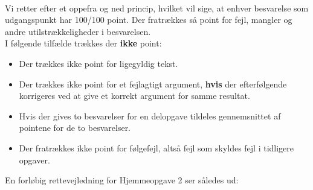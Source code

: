 \documentclass{article}
\begin{document}
\vspace*{0.2cm}\\
Vi retter efter et oppefra og ned princip, hvilket vil sige, at enhver besvarelse som udgangspunkt har 100/100 point. Der fratrækkes så point for fejl, mangler og andre utilstrækkeligheder i besvarelsen.
\vspace*{0.2cm}\\
I følgende tilfælde trækkes der \textbf{ikke} point:
\begin{itemize}
	\item Der trækkes ikke point for ligegyldig tekst.
	\item Der trækkes ikke point for et fejlagtigt argument, \textbf{hvis} der efterfølgende korrigeres ved at give et korrekt argument for samme resultat. 
	\item Hvis der gives to besvarelser for en delopgave tildeles gennemsnittet af pointene for de to besvarelser.
	\item Der fratrækkes ikke point for følgefejl, altså fejl som skyldes fejl i tidligere opgaver.
\end{itemize}

En forløbig rettevejledning for Hjemmeopgave 2 ser således ud:
\end{document}
